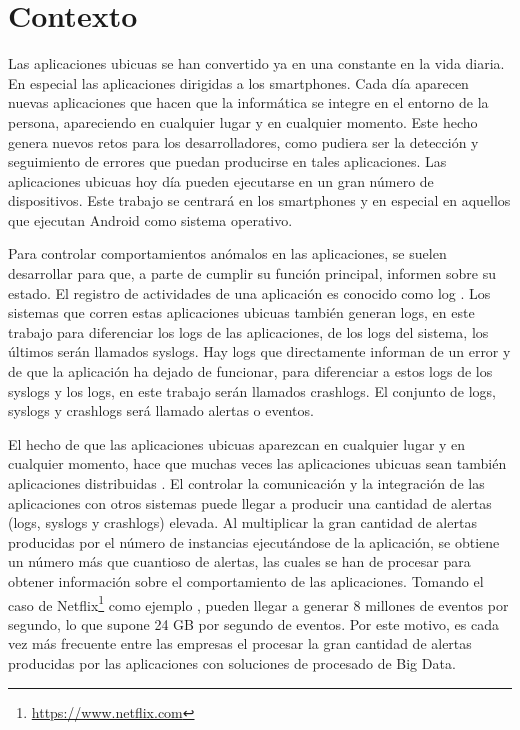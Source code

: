 \section{Contexto}
Las aplicaciones ubicuas \cite{Tfg:ubiquitous} se han convertido ya en una constante en la vida diaria. En especial las aplicaciones dirigidas a los smartphones. Cada día aparecen nuevas aplicaciones que hacen que la informática se integre en el entorno de la persona, apareciendo en cualquier lugar y en cualquier momento. Este hecho genera nuevos retos para los desarrolladores, como pudiera ser la detección y seguimiento de errores que puedan producirse en tales aplicaciones. Las aplicaciones ubicuas hoy día pueden ejecutarse en un gran número de dispositivos. Este trabajo se centrará en los smartphones y en especial en aquellos que ejecutan Android como sistema operativo.

Para controlar comportamientos anómalos en las aplicaciones, se suelen desarrollar para que, a parte de cumplir su función principal, informen sobre su estado. El registro de actividades de una aplicación es conocido como log \cite{Tfg:thelog}. Los sistemas que corren estas aplicaciones ubicuas también generan logs, en este trabajo para diferenciar los logs de las aplicaciones, de los logs del sistema, los últimos serán llamados syslogs. Hay logs que directamente informan de un error y de que la aplicación ha dejado de funcionar, para diferenciar a estos logs de los syslogs y los logs, en este trabajo serán llamados crashlogs. El conjunto de logs, syslogs y crashlogs será llamado alertas o eventos.

El hecho de que las aplicaciones ubicuas aparezcan en cualquier lugar y en cualquier momento, hace que muchas veces las aplicaciones ubicuas sean también aplicaciones distribuidas \cite{Tfg:distributedapp}. El controlar la comunicación y la integración de las aplicaciones con otros sistemas puede llegar a producir una cantidad de alertas (logs, syslogs y crashlogs) elevada. Al multiplicar la gran cantidad de alertas producidas por el número de instancias ejecutándose de la aplicación, se obtiene un número más que cuantioso de alertas, las cuales se han de procesar para obtener información sobre el comportamiento de las aplicaciones. Tomando el caso de Netflix\footnote{\href{https://www.netflix.com}{https://www.netflix.com}} como ejemplo \cite{Tfg:netflixpipe}, pueden llegar a generar 8 millones de eventos por segundo, lo que supone 24 GB por segundo de eventos. Por este motivo, es cada vez más frecuente entre las empresas el procesar la gran cantidad de alertas producidas por las aplicaciones con soluciones de procesado de Big Data.

